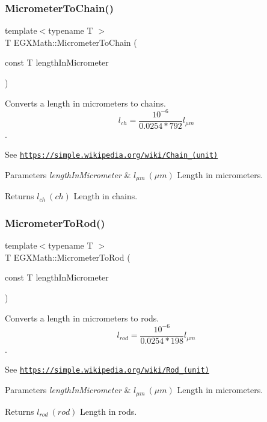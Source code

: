 \subsubsection{\texorpdfstring{Micrometer\+To\+Chain()}{MicrometerToChain()}}
{\footnotesize\ttfamily template$<$typename T $>$ \\
T E\+G\+X\+Math\+::\+Micrometer\+To\+Chain (\begin{DoxyParamCaption}\item[{const T}]{length\+In\+Micrometer }\end{DoxyParamCaption})}



Converts a length in micrometers to chains. \[ l_{ch}= \frac{10^{-6}}{0.0254 * 792} l_{\mu m} \]. 

See \href{https://simple.wikipedia.org/wiki/Chain_(unit)}{\tt https\+://simple.\+wikipedia.\+org/wiki/\+Chain\+\_\+(unit)} 
\begin{DoxyParams}{Parameters}
{\em length\+In\+Micrometer} & $ l_{\mu m}\ (\mu m)$ Length in micrometers. \\
\hline
\end{DoxyParams}
\begin{DoxyReturn}{Returns}
$ l_{ch}\ (ch)$ Length in chains. 
\end{DoxyReturn}
\mbox{\label{group___e_g_x_math-_conversions-_length_conversions-_micrometer-_surveyors_ga86e147ebc58116be9c15a873451ac156}} 
\subsubsection{\texorpdfstring{Micrometer\+To\+Rod()}{MicrometerToRod()}}
{\footnotesize\ttfamily template$<$typename T $>$ \\
T E\+G\+X\+Math\+::\+Micrometer\+To\+Rod (\begin{DoxyParamCaption}\item[{const T}]{length\+In\+Micrometer }\end{DoxyParamCaption})}



Converts a length in micrometers to rods. \[ l_{rod}= \frac{10^{-6}}{0.0254 * 198} l_{\mu m} \]. 

See \href{https://simple.wikipedia.org/wiki/Rod_(unit)}{\tt https\+://simple.\+wikipedia.\+org/wiki/\+Rod\+\_\+(unit)} 
\begin{DoxyParams}{Parameters}
{\em length\+In\+Micrometer} & $ l_{\mu m}\ (\mu m)$ Length in micrometers. \\
\hline
\end{DoxyParams}
\begin{DoxyReturn}{Returns}
$ l_{rod}\ (rod)$ Length in rods. 
\end{DoxyReturn}

